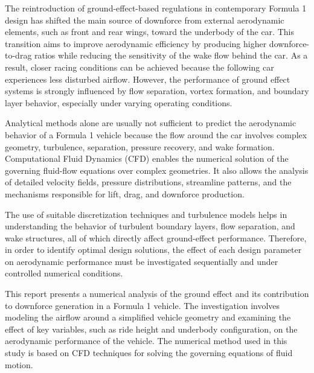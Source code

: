 \documentclass[12pt,a4paper]{article}
\begin{document}
\vspace{10pt}

The reintroduction of ground-effect-based regulations in contemporary Formula 1 design
has shifted the main source of downforce from external aerodynamic elements, such as
front and rear wings, toward the underbody of the car. This transition aims to improve
aerodynamic efficiency by producing higher downforce-to-drag ratios while reducing the
sensitivity of the wake flow behind the car. As a result, closer racing conditions can be
achieved because the following car experiences less disturbed airflow. However, the
performance of ground effect systems is strongly influenced by flow separation, vortex
formation, and boundary layer behavior, especially under varying operating conditions.

\vspace{10pt}

Analytical methods alone are usually not sufficient to predict the aerodynamic behavior
of a Formula 1 vehicle because the flow around the car involves complex geometry,
turbulence, separation, pressure recovery, and wake formation. Computational Fluid
Dynamics (CFD) enables the numerical solution of the governing fluid-flow equations
over complex geometries. It also allows the analysis of detailed velocity fields, pressure
distributions, streamline patterns, and the mechanisms responsible for lift, drag, and
downforce production.

\vspace{10pt}

The use of suitable discretization techniques and turbulence models helps in understanding
the behavior of turbulent boundary layers, flow separation, and wake structures, all of
which directly affect ground-effect performance. Therefore, in order to identify optimal
design solutions, the effect of each design parameter on aerodynamic performance must
be investigated sequentially and under controlled numerical conditions.

\vspace{10pt}

This report presents a numerical analysis of the ground effect and its contribution to
downforce generation in a Formula 1 vehicle. The investigation involves modeling the
airflow around a simplified vehicle geometry and examining the effect of key variables,
such as ride height and underbody configuration, on the aerodynamic performance of
the vehicle. The numerical method used in this study is based on CFD techniques for
solving the governing equations of fluid motion.
\end{document}
